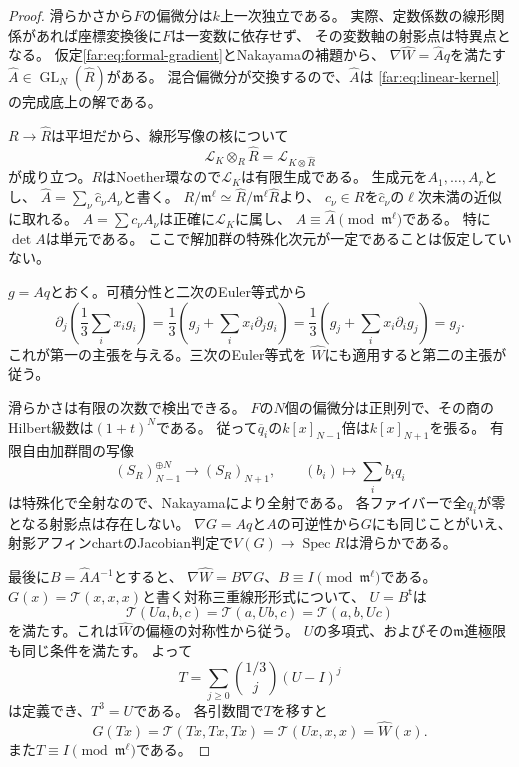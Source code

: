 \begin{proof}
滑らかさから$F$の偏微分は$k$上一次独立である。
実際、定数係数の線形関係があれば座標変換後に$F$は一変数に依存せず、
その変数軸の射影点は特異点となる。
仮定\eqref{far:eq:formal-gradient}とNakayamaの補題から、
$\nabla\widehat W=\widehat A q$を満たす
$\widehat A\in\operatorname{GL}_N(\widehat R)$がある。
混合偏微分が交換するので、$\widehat A$は
\eqref{far:eq:linear-kernel}の完成底上の解である。

$R\to\widehat R$は平坦だから、線形写像の核について
\[
 \mathcal L_K\otimes_R\widehat R=\mathcal L_{K\otimes\widehat R}
\]
が成り立つ。$R$はNoether環なので$\mathcal L_K$は有限生成である。
生成元を$A_1,\ldots,A_r$とし、
$\widehat A=\sum_\nu\widehat c_\nu A_\nu$と書く。
$R/\mathfrak m^\ell\simeq\widehat R/\mathfrak m^\ell\widehat R$より、
$c_\nu\in R$を$\widehat c_\nu$の$\ell$次未満の近似に取れる。
$A=\sum c_\nu A_\nu$は正確に$\mathcal L_K$に属し、
$A\equiv\widehat A\pmod{\mathfrak m^\ell}$である。
特に$\det A$は単元である。
ここで解加群の特殊化次元が一定であることは仮定していない。

$g=Aq$とおく。可積分性と二次のEuler等式から
\[
 \partial_j\left(\frac13\sum_i x_ig_i\right)
 =\frac13\left(g_j+\sum_i x_i\partial_jg_i\right)
 =\frac13\left(g_j+\sum_i x_i\partial_i g_j\right)=g_j.
\]
これが第一の主張を与える。三次のEuler等式を
$\widehat W$にも適用すると第二の主張が従う。

滑らかさは有限の次数で検出できる。
$F$の$N$個の偏微分は正則列で、その商のHilbert級数は$(1+t)^N$である。
従って$\overline q_i$の$k[x]_{N-1}$倍は$k[x]_{N+1}$を張る。
有限自由加群間の写像
\begin{equation}\label{far:eq:macaulay}
 (S_R)_{N-1}^{\oplus N}\longrightarrow(S_R)_{N+1},
 \qquad (b_i)\longmapsto\sum_i b_iq_i
\end{equation}
は特殊化で全射なので、Nakayamaにより全射である。
各ファイバーで全$q_i$が零となる射影点は存在しない。
$\nabla G=Aq$と$A$の可逆性から$G$にも同じことがいえ、
射影アフィンchartのJacobian判定で$V(G)\to\operatorname{Spec}R$は滑らかである。

最後に$B=\widehat A A^{-1}$とすると、
$\nabla\widehat W=B\nabla G$、$B\equiv I\pmod{\mathfrak m^\ell}$である。
$G(x)=\mathcal T(x,x,x)$と書く対称三重線形形式について、
$U=B^{\mathsf t}$は
\[
 \mathcal T(Ua,b,c)=\mathcal T(a,Ub,c)=\mathcal T(a,b,Uc)
\]
を満たす。これは$\widehat W$の偏極の対称性から従う。
$U$の多項式、およびその$\mathfrak m$進極限も同じ条件を満たす。
よって
\[
 T=\sum_{j\ge0}\binom{1/3}{j}(U-I)^j
\]
は定義でき、$T^3=U$である。
各引数間で$T$を移すと
\[
 G(Tx)=\mathcal T(Tx,Tx,Tx)
 =\mathcal T(Ux,x,x)=\widehat W(x).
\]
また$T\equiv I\pmod{\mathfrak m^\ell}$である。
\end{proof}

